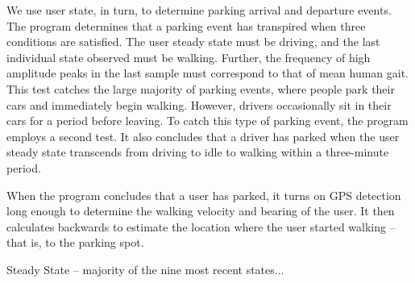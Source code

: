
We use user state, in turn, to determine parking arrival and departure
events. The program determines that a parking event has transpired when
three conditions are satisfied. The user steady state must be driving, and
the last individual state observed must be walking. Further, the frequency
of high amplitude peaks in the last sample must correspond to that of mean
human gait. This test catches the large majority of parking events, where
people park their cars and immediately begin walking. However, drivers
occasionally sit in their cars for a period before leaving. To catch this
type of parking event, the program employs a second test. It also concludes
that a driver has parked when the user steady state transcends from driving
to idle to walking within a three-minute period.

When the program concludes that a user has parked, it turns on GPS detection
long enough to determine the walking velocity and bearing of the user. It
then calculates backwards to estimate the location where the user started
walking – that is, to the parking spot.

Steady State – majority of the nine most recent states...
